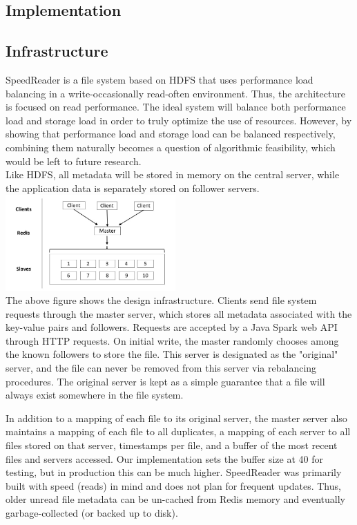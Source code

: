 \documentclass[twoside]{article}
\begin{document}
\begin{multicols}{2}

\section{Implementation}
\subsection*{Infrastructure}
SpeedReader is a file system based on HDFS that uses performance load balancing in a write-occasionally read-often environment. Thus, the architecture is focused on read performance. The ideal system will balance both performance load and storage load in order to truly optimize the use of resources. However, by showing that performance load and storage load can be balanced respectively, combining them naturally becomes a question of algorithmic feasibility, which would be left to future research.\\\indent
Like HDFS, all metadata will be stored in memory on the central server, while the application data is separately stored on follower servers.
\includegraphics[width=6.5cm]{res/server_diagram.jpg}\\\indent
The above figure shows the design infrastructure. Clients send file system requests through the master server, which stores all metadata associated with the key-value pairs and followers. Requests are accepted by a Java Spark web API through HTTP requests. On initial write, the master randomly chooses among the known followers to store the file. This server is designated as the "original" server, and the file can never be removed from this server via rebalancing procedures. The original server is kept as a simple guarantee that a file will always exist somewhere in the file system. 

In addition to a mapping of each file to its original server, the master server also maintains a mapping of each file to all duplicates, a mapping of each server to all files stored on that server, timestamps per file, and a buffer of the most recent files and servers accessed. Our implementation sets the buffer size at 40 for testing, but in production this can be much higher. SpeedReader was primarily built with speed (reads) in mind and does not plan for frequent updates. Thus, older unread file metadata can be un-cached from Redis memory and eventually garbage-collected (or backed up to disk).


\end{multicols}
\end{document}
